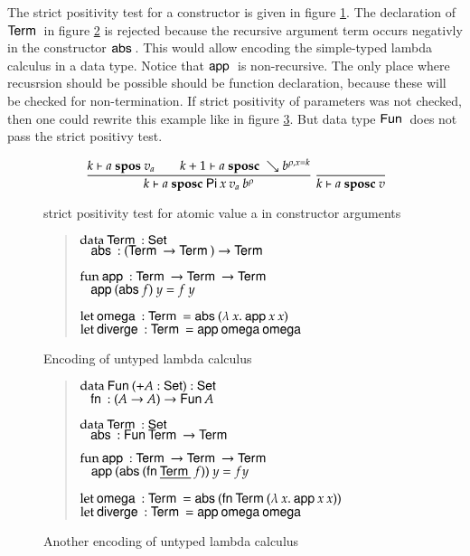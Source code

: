 The strict positivity test for a constructor is given in figure \ref{sposcf}.
The declaration of $\mathsf{Term}\:$ in figure \ref{abs1} is rejected because the recursive argument term occurs
negativly in the constructor $\mathsf{abs}\:$.
This would allow encoding the simple-typed lambda calculus in a data type.
Notice that $\mathsf{app}\:$ is non-recursive. The only place where recusrsion should be possible should be function declaration,
because these will be checked for non-termination.
If strict positivity of parameters was not checked, then one could rewrite this example like in figure \ref{abs2}.
But data type $\mathsf{Fun}\:$ does not pass the strict positivy test.

\begin{figure}
\begin{gather*}
\ \dfrac{ k\vdash a\mbox{ \textbf{spos} }v_a \qquad k+1\vdash a\mbox{ \textbf{sposc} }\searrow b^{\rho,x=k}}{k\vdash a\mbox{ \textbf{sposc} }\mathsf{Pi} \: x \: v_a \: b^{\rho}  }
\ \dfrac{}{k\vdash a\mbox{ \textbf{sposc} }v}
\end{gather*}
\caption{strict positivity test for atomic value a in constructor arguments}
\label{sposcf}
\end{figure}

\begin{figure}
\begin{quote}
$\mathrm{data}\: \mathsf{Term}\: : \mathsf{Set}$\\
$\hspace*{3mm} \mathsf{abs}\: : (\mathsf{Term}\: \rightarrow \mathsf{Term}\:) \rightarrow \mathsf{Term}\:$

$\mathrm{fun}\: \mathsf{app}\: : \mathsf{Term}\: \rightarrow \mathsf{Term}\: \rightarrow \mathsf{Term}\:$\\
$\hspace*{3mm} \mathsf{app}\: (\mathsf{abs}\: f) \: y = f \: y$

$\mathrm{let}\:   \mathsf{omega}\: : \mathsf{Term}\: = \mathsf{abs}\: (\lambda\: x .\: \mathsf{app}\: x \: x)$\\
$\mathrm{let}\: \mathsf{diverge}\: : \mathsf{Term}\: = \mathsf{app}\: \mathsf{omega}\: \mathsf{omega}\:$
\end{quote}
\caption{Encoding of untyped lambda calculus}
\label{abs1}
\end{figure}

\begin{figure}
\begin{quote}
$\mathrm{data}\: \mathsf{Fun}\: (+ A : \mathsf{Set} ) : \mathsf{Set}$\\
$\hspace*{3mm} \mathsf{fn}\: : (A \rightarrow A) \rightarrow \mathsf{Fun}\: A$

$\mathrm{data}\: \mathsf{Term}\: : \mathsf{Set}$\\
$\hspace*{3mm} \mathsf{abs}\: : \mathsf{Fun}\: \mathsf{Term}\: \rightarrow \mathsf{Term}\:$

$\mathrm{fun}\: \mathsf{app}\: : \mathsf{Term}\: \rightarrow \mathsf{Term}\: \rightarrow \mathsf{Term}\:$\\
$\hspace*{3mm} \mathsf{app}\: (\mathsf{abs}\: (\mathsf{fn}\: \underline{\mathsf{Term}\:} \: f)) \: y = f y$

$\mathrm{let}\: \mathsf{omega}\: : \mathsf{Term}\: = \mathsf{abs}\: (\mathsf{fn}\: \mathsf{Term}\: (\lambda\: x .\: \mathsf{app}\: x \: x))$\\
$\mathrm{let}\: \mathsf{diverge}\: : \mathsf{Term}\: = \mathsf{app}\: \mathsf{omega}\: \mathsf{omega}\:$
\end{quote}
\caption{Another encoding of untyped lambda calculus}
\label{abs2}
\end{figure}


